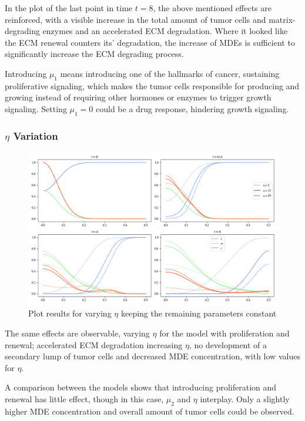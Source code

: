 In the plot of the last point in time $t=8$, the above mentioned effects are reinforced, with a visible increase in the total amount of tumor cells and matrix-degrading enzymes and an accelerated ECM degradation. Where it looked like the ECM renewal counters its' degradation, the increase of MDEs is sufficient to significantly increase the ECM degrading process.

Introducing $\mu_1$ means introducing one of the hallmarks of cancer, sustaining proliferative signaling, which makes the tumor cells responsible for producing and growing instead of requiring other hormones or enzymes to trigger growth signaling. Setting $\mu_1=0$ could be a drug response, hindering growth signaling.

\subsubsection*{$\eta$ Variation}
\begin{figure}[h!]
    \centering
    \includegraphics[width=\textwidth]{resources/images/prolif_eta_variation.png}
    \caption{Plot results for varying $\eta$ keeping the remaining parameters constant}
    \label{fig:prolif_eta_variation}
\end{figure}

The same effects are observable, varying $\eta$ for the model with proliferation and renewal; accelerated ECM degradation increasing $\eta$, no development of a secondary lump of tumor cells and decreased MDE concentration, with low values for $\eta$.

A comparison between the models shows that introducing proliferation and renewal has little effect, though in this case, $\mu_2$ and $\eta$ interplay. Only a slightly higher MDE concentration and overall amount of tumor cells could be observed.

